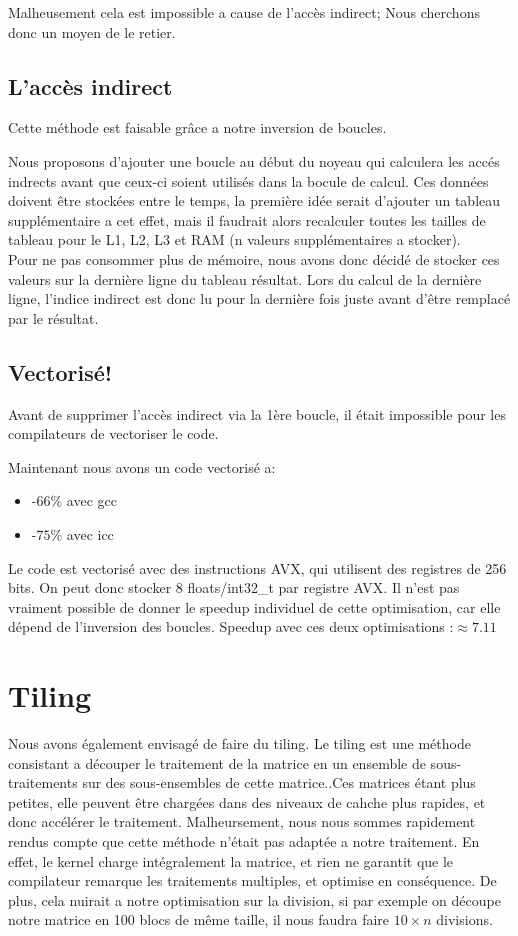 Malheusement cela est impossible a cause de l'accès indirect; Nous cherchons donc un moyen de le retier.
\subsection*{L'accès indirect}
Cette méthode est faisable grâce a notre inversion de boucles.

Nous proposons d'ajouter une boucle au début du noyeau qui calculera les accés indrects avant que ceux-ci soient utilisés dans la bocule de calcul.
Ces données doivent être stockées entre le temps, la première idée serait d'ajouter un tableau supplémentaire a cet effet, mais il faudrait alors recalculer toutes les tailles de tableau pour le L1, L2, L3 et RAM (n valeurs supplémentaires a stocker).\\

Pour ne pas consommer plus de mémoire, nous avons donc décidé de stocker ces valeurs sur la dernière ligne du tableau résultat.
Lors du calcul de la dernière ligne, l'indice indirect est donc lu pour la dernière fois juste avant d'être remplacé par le résultat. 

\subsection*{Vectorisé!}
Avant de supprimer l'accès indirect via la 1ère boucle, il était impossible pour les compilateurs de vectoriser le code.

Maintenant nous avons un code vectorisé a:
    \begin{itemize}
    \item{-$66\%$ avec gcc}
    \item{-$75\%$ avec icc}
    \end{itemize}

    Le code est vectorisé avec des instructions AVX, qui utilisent des registres de 256 bits. On peut donc stocker 8 floats/int32\_t par registre AVX.
    Il n'est pas vraiment possible de donner le speedup individuel de cette optimisation, car elle dépend de l'inversion des boucles.
Speedup avec ces deux optimisations :$\approx 7.11$
\section*{Tiling}
Nous avons également envisagé de faire du tiling. Le tiling est une méthode consistant a découper le traitement de la matrice en un ensemble de sous-traitements sur des sous-ensembles de cette matrice..Ces matrices étant plus petites, elle peuvent être chargées dans des niveaux de cahche plus rapides, et donc accélérer le traitement.
Malheursement, nous nous sommes rapidement rendus compte que cette méthode n'était pas adaptée a notre traitement.
En effet, le kernel charge intégralement la matrice, et rien ne garantit que le compilateur remarque les traitements multiples, et optimise en conséquence.
De plus, cela nuirait a notre optimisation sur la division, si par exemple on découpe notre matrice en 100 blocs de même taille, il nous faudra faire $10\times n $ divisions.

